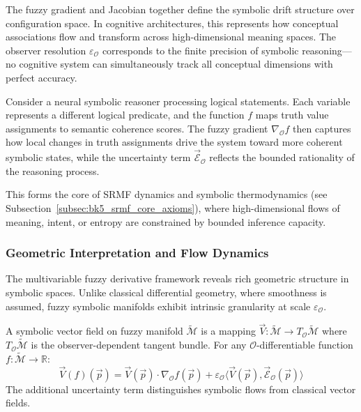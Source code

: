 
\begin{scholium}
\label{scholium:bk4_symbolic_drift_fields}
The fuzzy gradient and Jacobian together define the symbolic drift structure over configuration space. In cognitive architectures, this represents how conceptual associations flow and transform across high-dimensional meaning spaces. The observer resolution $\varepsilon_{\mathcal{O}}$ corresponds to the finite precision of symbolic reasoning—no cognitive system can simultaneously track all conceptual dimensions with perfect accuracy.

Consider a neural symbolic reasoner processing logical statements. Each variable represents a different logical predicate, and the function $f$ maps truth value assignments to semantic coherence scores. The fuzzy gradient $\nabla_{\mathcal{O}} f$ then captures how local changes in truth assignments drive the system toward more coherent symbolic states, while the uncertainty term $\vec{\mathcal{E}}_{\mathcal{O}}$ reflects the bounded rationality of the reasoning process.

This forms the core of SRMF dynamics and symbolic thermodynamics (see Subsection~\ref{subsec:bk5_srmf_core_axioms}), where high-dimensional flows of meaning, intent, or entropy are constrained by bounded inference capacity.
\end{scholium}


\subsubsection{Geometric Interpretation and Flow Dynamics}

The multivariable fuzzy derivative framework reveals rich geometric structure in symbolic spaces. Unlike classical differential geometry, where smoothness is assumed, fuzzy symbolic manifolds exhibit intrinsic granularity at scale $\varepsilon_{\mathcal{O}}$.

\begin{definition}
\label{definition:symbolic_vector_field}
A symbolic vector field on fuzzy manifold $\tilde{\mathcal{M}}$ is a mapping $\vec{V}: \tilde{\mathcal{M}} \to T_{\mathcal{O}}\tilde{\mathcal{M}}$ where $T_{\mathcal{O}}\tilde{\mathcal{M}}$ is the observer-dependent tangent bundle. For any $\mathcal{O}$-differentiable function $f: \tilde{\mathcal{M}} \to \mathbb{R}$:
\[
\vec{V}(f)(\vec{p}) = \vec{V}(\vec{p}) \cdot \nabla_{\mathcal{O}} f(\vec{p}) + \varepsilon_{\mathcal{O}} \langle \vec{V}(\vec{p}), \vec{\mathcal{E}}_{\mathcal{O}}(\vec{p}) \rangle
\]
The additional uncertainty term distinguishes symbolic flows from classical vector fields.
\end{definition}

